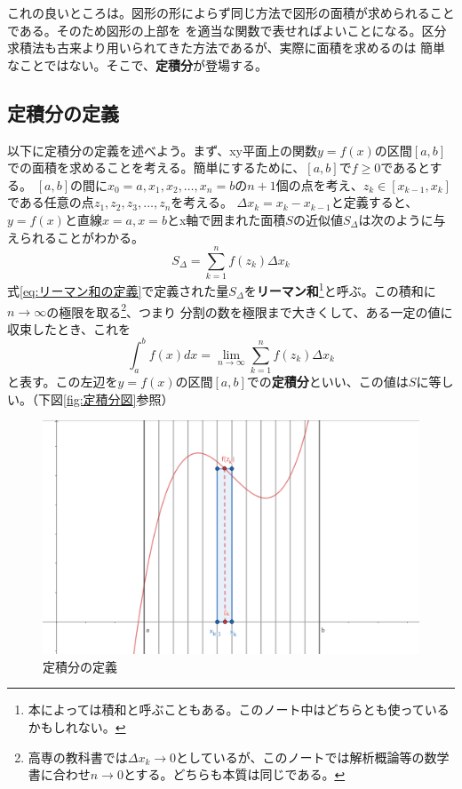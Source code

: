 \documentclass[a4j,dvipdfmx]{jsarticle}
\begin{document}
                これの良いところは。図形の形によらず同じ方法で図形の面積が求められることである。そのため図形の上部を
                を適当な関数で表せればよいことになる。区分求積法も古来より用いられてきた方法であるが、実際に面積を求めるのは
                簡単なことではない。そこで、\textbf{定積分}が登場する。
            \clearpage
            \subsection{定積分の定義}
                以下に定積分の定義を述べよう。まず、xy平面上の関数$y=f(x)$の区間$[a,b]$での面積を求めることを考える。簡単にするために、$[a,b]$で$f\geq0$であるとする。
                $[a,b]$の間に$x_0=a,x_1,x_2,\dots,x_n=b$の$n+1$個の点を考え、$z_k \in [x_{k-1},x_{k}]$である任意の点$z_1,z_2,z_3,\dots,z_{n}$を考える。
                $\Delta x_k=x_{k}-x_{k-1}$と定義すると、$y=f(x)$と直線$x=a,x=b$とx軸で囲まれた面積$S$の近似値$S_{\Delta}$は次のように与えられることがわかる。
                \begin{equation}
                    S_{\Delta} = \sum_{k=1}^{n}f(z_k)\Delta x_{k} \label{eq:リーマン和の定義}
                \end{equation}
                式\eqref{eq:リーマン和の定義}で定義された量$S_{\Delta}$を\textbf{リーマン和}\footnote{本によっては積和と呼ぶこともある。このノート中はどちらとも使っているかもしれない。}と呼ぶ。この積和に$n\to \infty$の極限を取る\footnote{高専の教科書では$\Delta x_k \to 0$としているが、このノートでは解析概論等の数学書に合わせ$n\to 0$とする。どちらも本質は同じである。}、つまり
                分割の数を極限まで大きくして、ある一定の値に収束したとき、これを
                \begin{equation}
                    \int_a^b f(x)dx = \lim_{n\to\infty}\sum_{k=1}^{n}f(z_k)\Delta x_k \label{eq:定積分の定義}
                \end{equation}
                と表す。この左辺を$y=f(x)$の区間$[a,b]$での\textbf{定積分}といい、この値は$S$に等しい。（下図\eqref{fig:定積分図}参照）

                \begin{figure}[h]
                    \centering
                    \includegraphics[scale=0.35]{img/QuuNote/integral_picture.png}
                    \caption{定積分の定義}\label{fig:定積分図}
                \end{figure}
\end{document}
